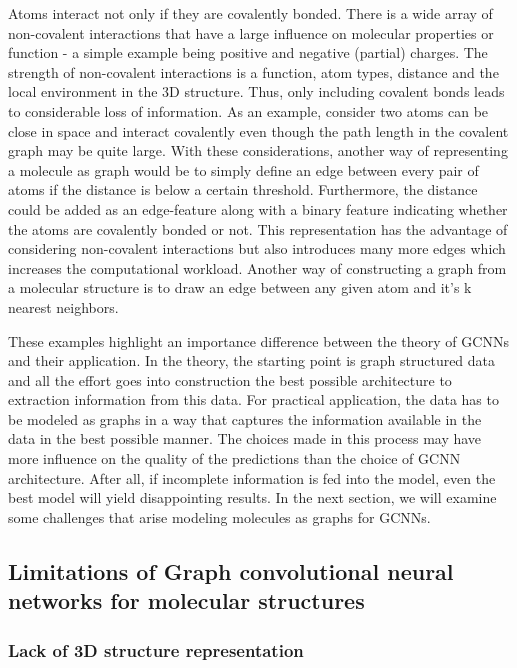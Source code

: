 Atoms interact not only if they are covalently bonded. There is a wide array of non-covalent interactions that have a large influence on molecular properties or function - a simple example being positive and negative (partial) charges. The strength of non-covalent interactions is a function, atom types, distance and the local environment in the 3D structure. Thus, only including covalent bonds leads to considerable loss of information. As an example, consider two atoms can be close in space and interact covalently even though the path length in the covalent graph may be quite large.
With these considerations, another way of representing a molecule as graph would be to simply define an edge between every pair of atoms if the distance is below a certain threshold. Furthermore, the distance could be added as an edge-feature along with a binary feature indicating whether the atoms are covalently bonded or not. This representation has the advantage of considering non-covalent interactions but also introduces many more edges which increases the computational workload. Another way of constructing a graph from a molecular structure is to draw an edge between any given atom and it's k nearest neighbors.

These examples highlight an importance difference between the theory of GCNNs and their application. In the theory, the starting point is graph structured data and all the effort goes into construction the best possible architecture to extraction information from this data. For practical application, the data has to be modeled as graphs in a way that captures the information available in the data in the best possible manner. The choices made in this process may have more influence on the quality of the predictions than the choice of GCNN architecture. After all, if incomplete information is fed into the model, even the best model will yield disappointing results. In the next section, we will examine some challenges that arise modeling molecules as graphs for GCNNs.



\subsection{Limitations of Graph convolutional neural networks for molecular structures}
\label{sec:limitations}

\subsubsection{Lack of 3D structure representation}
\label{sec:lack-of-3d-structure}

